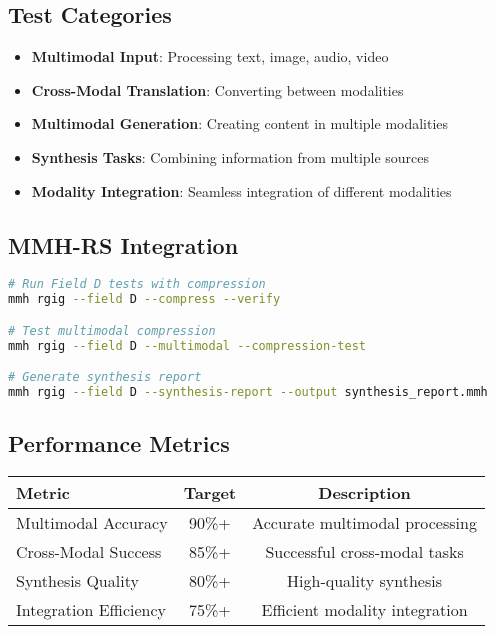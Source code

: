 \documentclass[12pt,a4paper]{article}
\begin{document}
\subsection{Test Categories}
\begin{itemize}
    \item \textbf{Multimodal Input}: Processing text, image, audio, video
    \item \textbf{Cross-Modal Translation}: Converting between modalities
    \item \textbf{Multimodal Generation}: Creating content in multiple modalities
    \item \textbf{Synthesis Tasks}: Combining information from multiple sources
    \item \textbf{Modality Integration}: Seamless integration of different modalities
\end{itemize}

\subsection{MMH-RS Integration}
\begin{lstlisting}[language=bash, caption=Field D Testing with MMH-RS]
# Run Field D tests with compression
mmh rgig --field D --compress --verify

# Test multimodal compression
mmh rgig --field D --multimodal --compression-test

# Generate synthesis report
mmh rgig --field D --synthesis-report --output synthesis_report.mmh
\end{lstlisting}

\subsection{Performance Metrics}
\begin{center}
\begin{tabular}{|l|c|c|}
\hline
\textbf{Metric} & \textbf{Target} & \textbf{Description} \\
\hline
Multimodal Accuracy & 90\%+ & Accurate multimodal processing \\
Cross-Modal Success & 85\%+ & Successful cross-modal tasks \\
Synthesis Quality & 80\%+ & High-quality synthesis \\
Integration Efficiency & 75\%+ & Efficient modality integration \\
\hline
\end{tabular}
\end{center}
\end{document}
